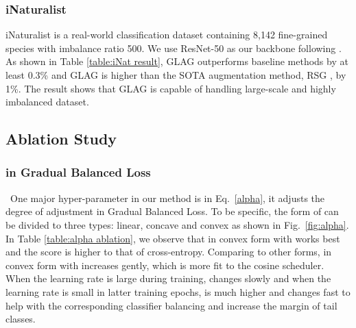 \documentclass[runningheads]{llncs}
\begin{document}
\subsubsection{iNaturalist} \;  iNaturalist is a real-world classification dataset containing 8,142 fine-grained species with imbalance ratio 500. We use ResNet-50 as our backbone following \cite{wang2021rsg}. As shown in Table \ref{table:iNat result}, GLAG outperforms baseline methods by at least 0.3\% and GLAG is higher than the SOTA augmentation method, RSG \cite{wang2021rsg}, by 1\%. The result shows that GLAG is capable of handling large-scale and highly imbalanced dataset.

\subsection{Ablation Study}


\subsubsection{ in Gradual Balanced Loss} \  One major hyper-parameter in our method is  in Eq.~\ref{alpha}, it adjusts the degree of adjustment in Gradual Balanced Loss. To be specific, the form of  can be divided to three types: linear, concave and convex as shown in Fig.~\ref{fig:alpha}. In Table \ref{table:alpha ablation}, we observe that  in convex form with  works best and the score is higher to that of cross-entropy. Comparing to other forms,  in convex form with  increases gently, which is more fit to the cosine scheduler. When the learning rate is large during training,  changes slowly and when the learning rate is small in latter training epochs,  is much higher and changes fast to help with the corresponding classifier balancing and increase the margin of tail classes. 
\end{document}
